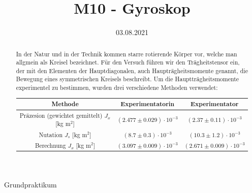 \documentclass[bibliography=totocnumbered]{scrartcl}
\date{03.08.2021}
\title{M10 - Gyroskop}
\begin{document}
	\begin{titlepage}
		\begin{center}
			{\huge{Grundpraktikum}}\\\vspace*{15mm}
			{\huge{\textbf{\thetitle}}}\\\vspace*{20mm}
			{\theauthor}\\\vspace*{10mm}
			{\thedate}\\\vspace*{20mm}
			\vspace{1.5cm}
			\begin{abstract}
				In der Natur und in der Technik kommen starre rotierende Körper vor, welche man allgmein als Kreisel bezeichnet. Für den Versuch führen wir den Trägheitstensor ein, der mit den Elementen der Hauptdiagonalen, auch Haupträgheitsmomente genannt, die Bewegung eines symmetrischen Kreisels beschreibt. Um die Hauptträgheitsmomente experimentel zu bestimmen, wurden drei verschiedene Methoden verwendet:
				
				\begin{table}[ht!]
					\centering
					\begin{tabular}{|c|c|c|}
					\hline
					Methode & Experimentatorin & Experimentator \\
					\hline
					Präzesion (gewichtet gemittelt) $ J_{x}$ [kg m$ ^{2} $] & $(2.477 \pm0.029)\cdot 10^{-3} $ & $ (2.37\pm0.11)\cdot 10^{-3} $ \\
					\hline
					Nutation $ J_{s} $ [kg m$ ^{2} $]& $(8.7 \pm0.3 )\cdot 10^{-3}$ & $(10.3 \pm1.2)\cdot 10^{-3} $ \\
					\hline
					Berechnung $ J_{x} $ [kg m$ ^{2} $]& $(3.097 \pm 0.009)\cdot 10^{-3}$ & $ (2.671\pm 0.009)\cdot 10^{-3}$ \\
					\hline
				\end{tabular}
				\end{table}
			
			\end{abstract}
			
			
		\end{center}
	\end{titlepage}
	\makeatother
	\restoregeometry
	\newpage
	
	\tableofcontents
	\newpage
	\listoffigures 
	\listoftables
	\newpage
	
	
	
\end{document}
